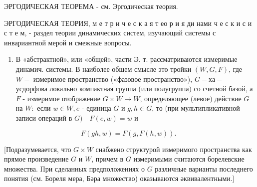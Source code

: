 \documentclass[10pt]{article}
\begin{document}
ЭРГОДИЧЕСКАЯ ТЕОРЕМА - см. Эргодическая теория.



ЭРГОДИЧЕСКАЯ ТЕОРИЯ, м е т р и ч е с к а я т ео р и я ди нами ч е с к и с и с т е м, - раздел теории динамических систем, изучающий системы с инвариантной мерой и смежные вопросы.



\begin{enumerate}

  \item В «абстрактной», или «общей», части Э. т. рассматриваются измеримые динамич. системы. В наиболее общем смысле это тройки $(W, G, F)$, где $W-$ измеримое пространство («фазовое пространство»), $G-\mathbf{х а -}$ усдорфова локально компактная группа (или полугруппа) со счетной базой, а $F$ - измеримое отображение $G \times W \rightarrow W$, определяющее (левое) действие $G$ на $W:$ если $w \in W, e$ - единица $G$ и $g, h \in G$, то (при мультипликативной записи операций в $G) \quad F(e, w)=w$ и

\end{enumerate}



\[

F(g h, w)=F(g, F(h, w)) \text {. }

\]



[Подразумевается, что $G \times W$ снабжено структуроӥ измеримого пространства как прямое произведение $G$ и $W$, причем в $G$ измеримыми считаются борелевские множества. При сделанных предположениях о $G$ различные варианты последнего понятия (см. Бореля мера, Бәра множество) оказываются әквивалентными.]
\end{document}
